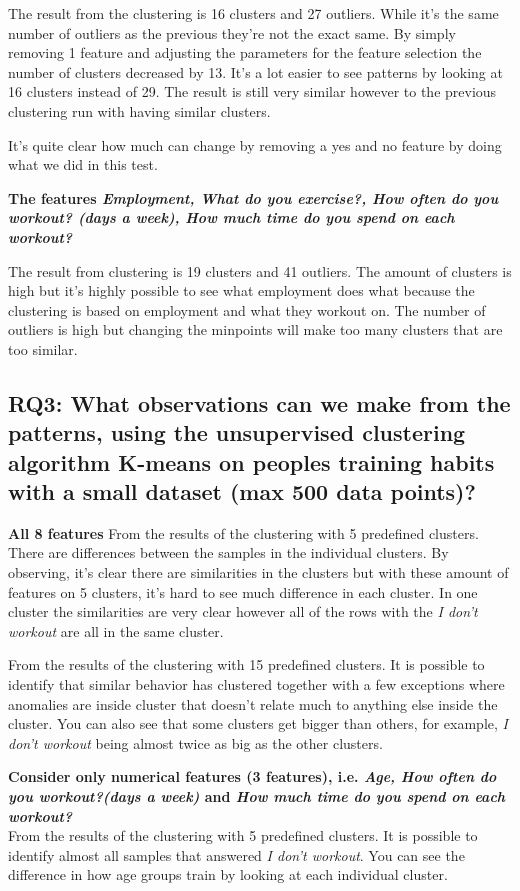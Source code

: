 \documentclass[a4paper]{article}
\begin{document}
The result from the clustering is 16 clusters and 27 outliers. While it's the same number of outliers as the previous they're not the exact same. By simply removing 1 feature and adjusting the parameters for the feature selection the number of clusters decreased by 13. It's a lot easier to see patterns by looking at 16 clusters instead of 29. The result is still very similar however to the previous clustering run with having similar clusters. 

It's quite clear how much can change by removing a yes and no feature by doing what we did in this test.

\textbf{The features \textit{Employment, What do you exercise?, How often do you workout? (days a week), How much time do you spend on each workout?}}


The result from clustering is 19 clusters and 41 outliers. The amount of clusters is high but it's highly possible to see what employment does what because the clustering is based on employment and what they workout on. The number of outliers is high but changing the minpoints will make too many clusters that are too similar. 

\newpage
\subsection{RQ3:  What observations can we make from the patterns, using the unsupervised clustering algorithm K-means on peoples training habits with a small dataset (max 500 data points)?}

\textbf{All 8 features}\newline
From the results of the clustering with 5 predefined clusters. There are differences between the samples in the individual clusters. By observing, it's clear there are similarities in the clusters but with these amount of features on 5 clusters, it's hard to see much difference in each cluster. In one cluster the similarities are very clear however all of the rows with the \textit{I don't workout} are all in the same cluster.

From the results of the clustering with 15 predefined clusters. It is possible to identify that similar behavior has clustered together with a few exceptions where anomalies are inside cluster that doesn't relate much to anything else inside the cluster. You can also see that some clusters get bigger than others, for example, \textit{I don't workout} being almost twice as big as the other clusters.

\textbf{Consider only numerical features (3 features), i.e. \textit{Age, How often do you workout?(days 
a week)} and \textit{How much time do you spend on each workout?}}\newline\\
From the results of the clustering with 5 predefined clusters. It is possible to identify almost all samples that answered \textit{I don't workout}. You can see the difference in how age groups train by looking at each individual cluster.
\end{document}
